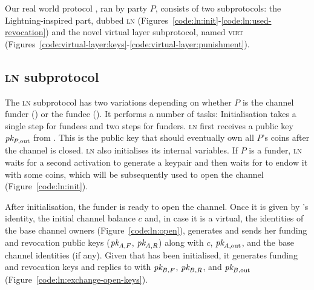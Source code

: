   Our real world protocol \pchan, ran by party $P$, consists of two
  subprotocols: the Lightning-inspired part, dubbed \textsc{ln}
  (Figures~\ref{code:ln:init}-\ref{code:ln:used-revocation}) and the novel
  virtual layer subprotocol, named \textsc{virt}
  (Figures~\ref{code:virtual-layer:keys}-\ref{code:virtual-layer:punishment}).

\subsection{\textsc{ln} subprotocol}
  \label{construction:ln}
  The \textsc{ln} subprotocol has two variations depending on whether $P$ is the
  channel funder (\alice) or the fundee (\bob). It performs a number of tasks:
  Initialisation takes a single step for fundees and two steps for funders.
  \textsc{ln} first receives a public key $\textit{pk}_{P, \mathrm{out}}$ from
  \environment. This is the public key that should eventually own all $P$'s
  coins after the channel is closed. \textsc{ln} also initialises its internal
  variables. If $P$ is a funder, \textsc{ln} waits for a second activation to
  generate a keypair and then waits for \environment to endow it with some
  coins, which will be subsequently used to open the channel
  (Figure~\ref{code:ln:init}).

  After initialisation, the funder \alice is ready to open the channel. Once it
  is given by \environment \bob's identity, the initial channel balance $c$ and,
  in case it is a virtual, the identities of the base channel owners
  (Figure~\ref{code:ln:open}), \alice generates and sends \bob her funding and
  revocation public keys ($\textit{pk}_{A, F}$, $\textit{pk}_{A, R}$) along with $c$, $\textit{pk}_{A,
  \mathrm{out}}$, and the base channel identities (if any). Given that \bob has
  been initialised, it generates funding and revocation keys and replies to
  \alice with $\textit{pk}_{B, F}$, $\textit{pk}_{B, R}$, and $\textit{pk}_{B, \mathrm{out}}$
  (Figure~\ref{code:ln:exchange-open-keys}).


